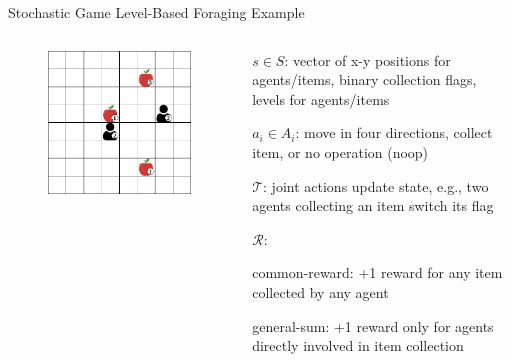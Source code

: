 \begin{frame}{Stochastic Game Level-Based Foraging Example}

\begin{columns}
    \begin{column}{0.45\textwidth}
    \begin{figure}
        \centering
        \includegraphics[width = 0.8\linewidth, keepaspectratio]{images/environments/lbf/lbf-8x8-2p-3f.png}
        \label{fig:enter-label}
    \end{figure}
    \end{column}

    \begin{column}{0.55\textwidth}
    \vspace{5pt}
    \blist
        \item \(s \in S\): vector of x-y positions for agents/items, binary collection flags, levels for agents/items
        \item \(a_i \in A_i\): move in four directions, collect item, or no operation (noop)
        \item \(\mathcal{T}\): joint actions update state, e.g., two agents collecting an item switch its flag
        \item \(\mathcal{R}\):
            \blist
                \item common-reward: +1 reward for any item collected by any agent
                \item general-sum: +1 reward only for agents directly involved in item collection
            \elist
    \elist
    \end{column}

\end{columns}
\end{frame}

